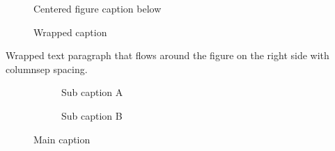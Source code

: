 \documentclass[10pt]{article}
\begin{document}
\begin{figure}[htbp]
  \centering
  \fbox{\rule{0pt}{2cm}\rule{2cm}{0pt}}
  \caption{Centered figure caption below}
  \label{fig:main}
\end{figure}

\begin{figure}
  \fbox{\rule{0pt}{1.5cm}\rule{0.4\textwidth}{0pt}}
  \caption{Wrapped caption}
\end{figure}
Wrapped text paragraph that flows around the figure on the right side with columnsep spacing.

\begin{figure}[htbp]
  \centering
  \begin{subfigure}{0.48\textwidth}
    \centering
    \fbox{\rule{0pt}{1cm}\rule{0.45\textwidth}{0pt}}
    \caption{Sub caption A}
  \end{subfigure}
  \begin{subfigure}{0.48\textwidth}
    \centering
    \fbox{\rule{0pt}{1cm}\rule{0.45\textwidth}{0pt}}
    \caption{Sub caption B}
  \end{subfigure}
  \caption{Main caption}
\end{figure}
\end{document}
